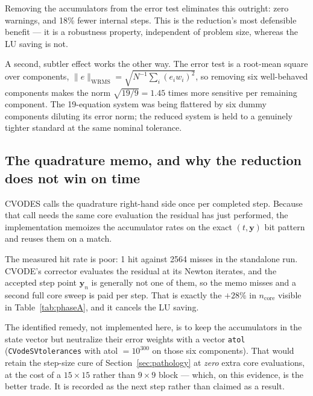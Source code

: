 \documentclass[11pt,a4paper]{article}
\newcommand{\code}[1]{\texttt{\small #1}}
\begin{document}
Removing the accumulators from the error test eliminates this outright: zero
warnings, and 18\% fewer internal steps. This is the reduction's most defensible
benefit --- it is a robustness property, independent of problem size, whereas
the LU saving is not.

A second, subtler effect works the other way. The error test is a root-mean
square over components, $\|e\|_{\mathrm{WRMS}}=\sqrt{N^{-1}\sum_i(e_iw_i)^2}$,
so removing six well-behaved components makes the norm $\sqrt{19/9}=1.45$ times
more sensitive per remaining component. The 19-equation system was being
flattered by six dummy components diluting its error norm; the reduced system
is held to a genuinely tighter standard at the same nominal tolerance.

\subsection{The quadrature memo, and why the reduction does not win on time}
\label{sec:memo}

CVODES calls the quadrature right-hand side once per completed step. Because
that call needs the same core evaluation the residual has just performed, the
implementation memoizes the accumulator rates on the exact $(t,\mathbf y)$ bit
pattern and reuses them on a match.

The measured hit rate is poor: 1 hit against 2564 misses in the standalone run.
CVODE's corrector evaluates the residual at its Newton iterates, and the
accepted step point $\mathbf y_n$ is generally not one of them, so the memo
misses and a second full core sweep is paid per step. That is exactly the
${+}28\%$ in $n_{\mathrm{core}}$ visible in Table~\ref{tab:phaseA}, and it
cancels the LU saving.

The identified remedy, not implemented here, is to keep the accumulators in the
state vector but neutralize their error weights with a vector \code{atol}
(\code{CVodeSVtolerances} with atol $=10^{300}$ on those six components). That
would retain the step-size cure of Section~\ref{sec:pathology} at \emph{zero}
extra core evaluations, at the cost of a $15\times15$ rather than $9\times9$
block --- which, on this evidence, is the better trade. It is recorded as the
next step rather than claimed as a result.

\end{document}
